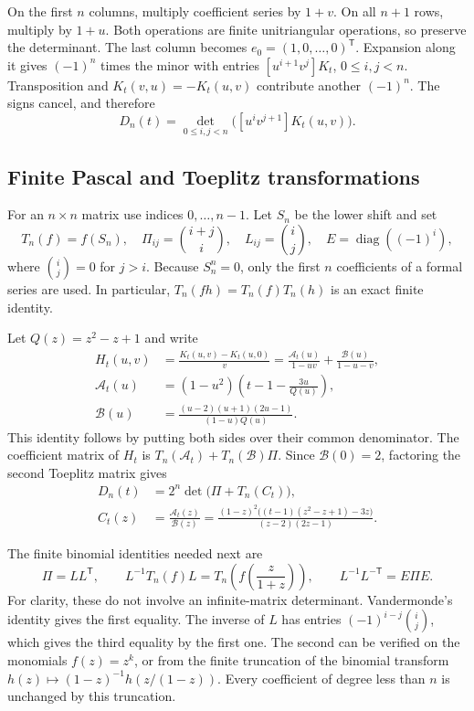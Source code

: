 \documentclass[11pt,letterpaper]{article}
\theoremstyle{remark}\newtheorem{remark}[theorem]{Remark}
\begin{document}
On the first $n$ columns, multiply coefficient series by $1+v$.
On all $n+1$ rows, multiply by $1+u$. Both operations are finite
unitriangular operations, so preserve the determinant. The last
column becomes $e_0=(1,0,\ldots,0)^{\mathsf T}$. Expansion along it
gives $(-1)^n$ times the minor with entries
$[u^{i+1}v^j]K_t$, $0\le i,j<n$. Transposition and
$K_t(v,u)=-K_t(u,v)$ contribute another $(-1)^n$. The signs cancel,
and therefore
\begin{equation}\label{dsasm:log:minordet}
 D_n(t)=\det_{0\le i,j<n}\bigl([u^iv^{j+1}]K_t(u,v)\bigr).
\end{equation}

\subsection{Finite Pascal and Toeplitz transformations}
For an $n\times n$ matrix use indices $0,\ldots,n-1$. Let $S_n$ be
the lower shift and set
\[
 T_n(f)=f(S_n),\quad
 \Pi_{ij}=\binom{i+j}{i},\quad L_{ij}=\binom ij,\quad
 E=\operatorname{diag}((-1)^i),
\]
where $\binom ij=0$ for $j>i$. Because $S_n^n=0$, only the first $n$
coefficients of a formal series are used. In particular,
$T_n(fh)=T_n(f)T_n(h)$ is an exact finite identity.

Let $Q(z)=z^2-z+1$ and write
\begin{equation}\label{dsasm:log:Hdecomp}
\begin{split}
 H_t(u,v)&=\frac{K_t(u,v)-K_t(u,0)}{v}
       =\frac{\mathcal A_t(u)}{1-uv}
           +\frac{\mathcal B(u)}{1-u-v},\\
 \mathcal A_t(u)&=(1-u^2)\left(t-1-\frac{3u}{Q(u)}\right),\\
 \mathcal B(u)&=\frac{(u-2)(u+1)(2u-1)}{(1-u)Q(u)}.
\end{split}
\end{equation}
This identity follows by putting both sides over their common
denominator. The coefficient matrix of $H_t$ is
$T_n(\mathcal A_t)+T_n(\mathcal B)\Pi$. Since
$\mathcal B(0)=2$, factoring the second Toeplitz matrix gives
\begin{equation}\label{dsasm:log:pascaldet}
\begin{split}
 D_n(t)&=2^n\det\bigl(\Pi+T_n(C_t)\bigr),\\
 C_t(z)&=\frac{\mathcal A_t(z)}{\mathcal B(z)}
 =\frac{(1-z)^2\bigl((t-1)(z^2-z+1)-3z\bigr)}{(z-2)(2z-1)}.
\end{split}
\end{equation}

The finite binomial identities needed next are
\begin{equation}\label{dsasm:log:binomialidentities}
 \Pi=LL^{\mathsf T},\qquad
 L^{-1}T_n(f)L=T_n\!\left(f\!\left(\frac z{1+z}\right)\right),
 \qquad L^{-1}L^{-\mathsf T}=E\Pi E.
\end{equation}
For clarity, these do not involve an infinite-matrix determinant.
Vandermonde's identity gives the first equality.
The inverse of $L$ has entries $(-1)^{i-j}\binom ij$, which gives the
third equality by the first one. The second can be verified on the
monomials $f(z)=z^k$, or from the finite truncation of the binomial
transform $h(z)\mapsto(1-z)^{-1}h(z/(1-z))$. Every coefficient of
degree less than $n$ is unchanged by this truncation.
\end{document}
